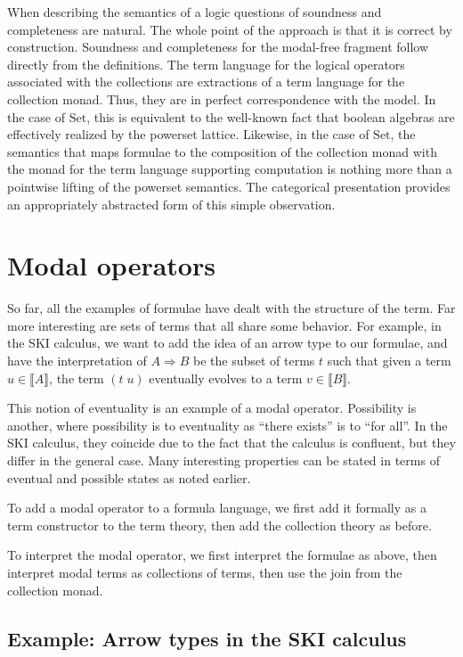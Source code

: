 \documentclass{llncs}
\newcommand{\interp}[1]{\llbracket #1 \rrbracket}
\newcommand{\Set}{\mathrm{Set}}
\begin{document}
When describing the semantics of a logic questions of soundness and
completeness are natural. The whole point of the approach is that it
is correct by construction. Soundness and completeness for the
modal-free fragment follow directly from the definitions. The term
language for the logical operators associated with the collections are
extractions of a term language for the collection monad. Thus, they
are in perfect correspondence with the model. In the case of $\Set$,
this is equivalent to the well-known fact that boolean algebras are
effectively realized by the powerset lattice. Likewise, in the case of
$\Set$, the semantics that maps formulae to the composition of the
collection monad with the monad for the term language supporting
computation is nothing more than a pointwise lifting of the powerset
semantics. The categorical presentation provides an appropriately
abstracted form of this simple observation.

\section{Modal operators}

So far, all the examples of formulae have dealt with the structure of the term.  Far more interesting are sets of terms that all share some behavior.  For example, in the SKI calculus, we want to add the idea of an arrow type to our formulae, and have the interpretation of $A \Rightarrow B$ be the subset of terms $t$ such that given a term $u\in\interp{A}$, the term $(t\; u)$ eventually evolves to a term $v\in\interp{B}.$

This notion of eventuality is an example of a modal operator.  Possibility is another, where possibility is to eventuality as ``there exists'' is to ``for all''.  In the SKI calculus, they coincide due to the fact that the calculus is confluent, but they differ in the general case. Many interesting properties can be stated in terms of eventual and possible states as noted earlier.

To add a modal operator to a formula language, we first add it formally as a term constructor to the term theory, then add the collection theory as before.  

To interpret the modal operator, we first interpret the formulae as above, then interpret modal terms as collections of terms, then use the join from the collection monad.

\subsection{Example: Arrow types in the SKI calculus}
\end{document}
